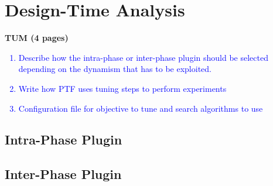 \section{Design-Time Analysis} \label{sec:dta}
\textbf{TUM (4 pages)} 

\textcolor{blue}{\begin{enumerate}
  \item Describe how the intra-phase or inter-phase plugin should be selected depending on the dynamism that has to be exploited. 
  \item Write how PTF uses tuning steps to perform experiments
  \item Configuration file for objective to tune and search algorithms to use
\end{enumerate}
}

\subsection{Intra-Phase Plugin} \label{sec:intra-phase}

\subsection{Inter-Phase Plugin} \label{sec:inter-phase}
